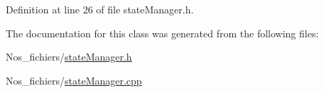 Definition at line 26 of file state\+Manager.\+h.



The documentation for this class was generated from the following files\+:\begin{DoxyCompactItemize}
\item 
Nos\+\_\+fichiers/\hyperlink{state_manager_8h}{state\+Manager.\+h}\item 
Nos\+\_\+fichiers/\hyperlink{state_manager_8cpp}{state\+Manager.\+cpp}\end{DoxyCompactItemize}
